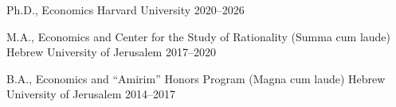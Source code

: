 

\begin{cventries}

  \cventry
    {Ph.D., Economics} %
    {Harvard University} %
    {} %
    {2020--2026} %
    {
    }

  \cventry
    {M.A., Economics and Center for the Study of Rationality (Summa cum laude)} %
    {Hebrew University of Jerusalem} %
    {} %
    {2017--2020} %
    {
      \begin{cvitems} %
      \end{cvitems}
    }

  \cventry
    {B.A., Economics and “Amirim” Honors Program (Magna cum laude)} %
    {Hebrew University of Jerusalem} %
    {} %
    {2014--2017} %
     {
     }

\end{cventries}
